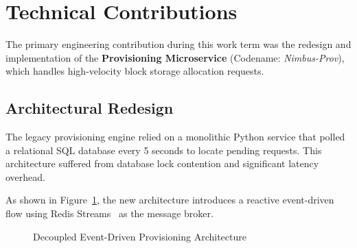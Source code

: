 \section{Technical Contributions}
\label{sec:technical_contributions}

The primary engineering contribution during this work term was the redesign and implementation of the \textbf{Provisioning Microservice} (Codename: \emph{Nimbus-Prov}), which handles high-velocity block storage allocation requests.

\subsection{Architectural Redesign}
The legacy provisioning engine relied on a monolithic Python service that polled a relational SQL database every 5 seconds to locate pending requests. This architecture suffered from database lock contention and significant latency overhead.

As shown in Figure~\ref{fig:arch_comparison}, the new architecture introduces a reactive event-driven flow using Redis Streams~\cite{kleppmann2017designing} as the message broker.

\begin{figure}[htbp]
\centering
{}
\caption{Decoupled Event-Driven Provisioning Architecture}
\label{fig:arch_comparison}
\end{figure}


